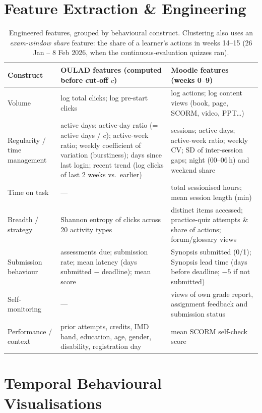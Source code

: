 \documentclass[10pt,a4paper]{article}
\begin{document}
\section{Feature Extraction \& Engineering}
\begin{table}[H]
\centering\footnotesize
\begin{tabularx}{\textwidth}{>{\raggedright\arraybackslash}p{2.6cm}LL}
\toprule
\textbf{Construct} & \textbf{OULAD features (computed before cut-off $c$)} & \textbf{Moodle features (weeks 0--9)} \\
\midrule
Volume & log total clicks; log pre-start clicks & log actions; log content views (book, page, SCORM, video, PPT\ldots) \\
Regularity / time management & active days; active-day ratio (= active days / $c$); active-week ratio; weekly
coefficient of variation (burstiness); days since last login; recent trend (log clicks of last 2 weeks vs.\ earlier)
& sessions; active days; active-week ratio; weekly CV; SD of inter-session gaps; night (00--06\,h) and weekend share \\
Time on task & --- & total sessionised hours; mean session length (min) \\
Breadth / strategy & Shannon entropy of clicks across 20 activity types & distinct items accessed; practice-quiz
attempts \& share of actions; forum/glossary views \\
Submission behaviour & assessments due; submission rate; mean latency (days submitted $-$ deadline); mean score &
Synopsis submitted (0/1); Synopsis lead time (days before deadline; $-5$ if not submitted) \\
Self-monitoring & --- & views of own grade report, assignment feedback and submission status \\
Performance / context & prior attempts, credits, IMD band, education, age, gender, disability, registration day &
mean SCORM self-check score \\
\bottomrule
\end{tabularx}
\caption{Engineered features, grouped by behavioural construct. Clustering also uses an \emph{exam-window share}
feature: the share of a learner's actions in weeks 14--15 (26 Jan -- 8 Feb 2026, when the continuous-evaluation
quizzes ran).}
\end{table}

\section{Temporal Behavioural Visualisations}
\end{document}

